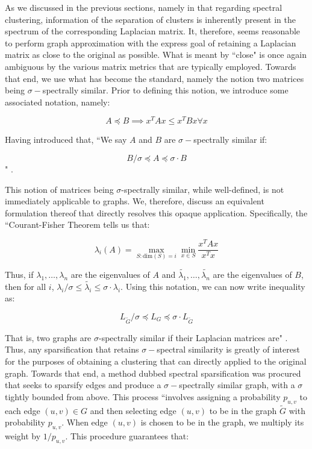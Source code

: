 \documentclass{article}
\begin{document}
As we discussed in the previous sections, namely in that regarding spectral clustering, information of the separation of clusters is inherently present in the spectrum of the corresponding Laplacian matrix. It, therefore, seems reasonable to perform graph approximation with the express goal of retaining a Laplacian matrix as close to the original as possible. What is meant by ``close" is once again ambiguous by the various matrix metrics that are typically employed. Towards that end, we use what has become the standard, namely the notion two matrices being $\sigma-$spectrally similar. Prior to defining this notion, we introduce some associated notation, namely:

$$ A \preceq B \implies x^T Ax \le x^T Bx \forall x $$

Having introduced that, ``We say $A$ and $B$ are $\sigma-$spectrally similar if:

$$ B / \sigma \preceq A \preceq \sigma\cdot B $$" \cite{spectral-sparse}.

This notion of matrices being $\sigma$-spectrally similar, while well-defined, is not immediately applicable to graphs. We, therefore, discuss an equivalent formulation thereof that directly resolves this opaque application. Specifically, the ``Courant-Fisher Theorem tells us that:

$$ \lambda_i(A) = \max_{S:\text{dim}(S)=i} \min_{x\in S} \frac{x^T Ax}{x^T x} $$

Thus, if $\lambda_1,\dots,\lambda_n$ are the eigenvalues of $A$ and $\widetilde{\lambda_1},\dots,\widetilde{\lambda_n}$ are the eigenvalues of $B$, then for all $i$, $\lambda_i / \sigma \le \widetilde{\lambda_i} \le \sigma\cdot\lambda_i$. Using this notation, we can now write inequality as:

$$ L_{\widetilde{G}} / \sigma \preceq L_{G} \preceq \sigma \cdot L_{\widetilde{G}}$$

That is, two graphs are $\sigma$-spectrally similar if their Laplacian matrices are" \cite{spectral-sparse}. Thus, any sparsification that retains $\sigma-$spectral similarity is greatly of interest for the purposes of obtaining a clustering that can directly applied to the original graph. Towards that end, a method dubbed spectral sparsification was procured that seeks to sparsify edges and produce a $\sigma-$spectrally similar graph, with a $\sigma$ tightly bounded from above. This process ``involves assigning a probability $p_{u,v}$ to each edge $(u, v)\in G$ and then selecting edge $(u, v)$ to be in the graph $\widetilde{G}$ with probability $p_{u,v}$. When edge $(u, v)$ is chosen to be in the graph, we multiply its weight by $1/p_{u,v}$. This procedure guarantees that:
\end{document}
